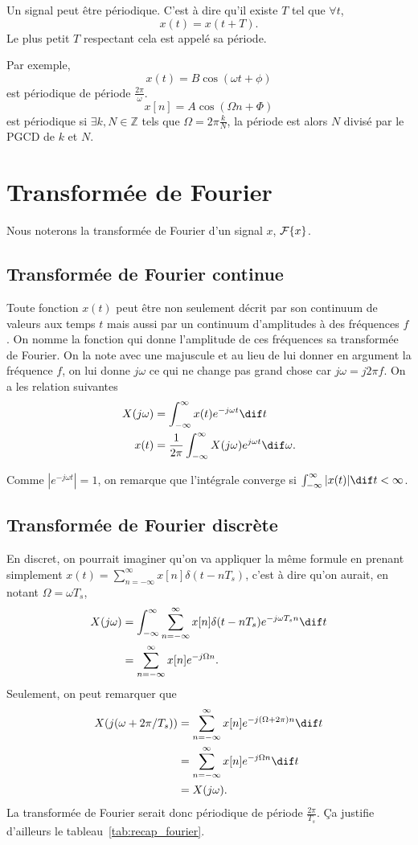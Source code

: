 Un signal peut être périodique.
C'est à dire qu'il existe $T$ tel que
$\forall t$,
\[ x(t) = x(t + T). \]
Le plus petit $T$ respectant cela est appelé sa période.

Par exemple,
\[ x(t) = B\cos(\omega t + \phi) \]
est périodique de période $\frac{2\pi}{\omega}$.
\[ x[n] = A\cos(\Omega n + \Phi) \]
est périodique si $\exists k, N \in \mathbb{Z}$ tels que
$\Omega = 2\pi\frac{k}{N}$, la période est alors $N$ divisé
par le PGCD de $k$ et $N$.

\section{Transformée de Fourier}
Nous noterons la transformée de Fourier d'un signal $x$, $\mathcal{F}\{x\}$.

\subsection{Transformée de Fourier continue}
Toute fonction $x(t)$ peut être non seulement décrit par son continuum de
valeurs aux temps $t$ mais aussi par un continuum d'amplitudes à des fréquences
$f$.
On nomme la fonction qui donne l'amplitude de ces fréquences sa transformée
de Fourier.
On la note avec une majuscule et au lieu de lui donner en argument la fréquence
$f$, on lui donne $j\omega$ ce qui ne change pas grand chose car
$j\omega = j2\pi f$.
On a les relation suivantes
\begin{align}
  \label{eq:tfc}
  X(j\omega) & = \int_{-\infty}^\infty x(t) e^{-j\omega t} \dif t\\
  \nonumber
  x(t) & = \frac{1}{2\pi} \int_{-\infty}^\infty X(j\omega) e^{j\omega t}
  \dif \omega.
\end{align}

Comme $|e^{-j\omega t}| = 1$, on remarque que l'intégrale
converge si $\int_{-\infty}^\infty |x(t)| \dif t < \infty$.

\subsection{Transformée de Fourier discrète}
\label{sec:fourier_discret}
En discret, on pourrait imaginer qu'on va appliquer la même formule en prenant
simplement $x(t) =  \sum_{n=-\infty}^\infty x[n] \delta(t-nT_s)$, c'est à dire
qu'on aurait, en notant $\Omega = \omega T_s$,
\begin{align}
  \label{eq:tfd}
  X(j\omega) & = \int_{-\infty}^\infty \sum_{n=-\infty}^\infty x[n]
  \delta(t-nT_s) e^{-j\omega T_sn} \dif t\\
  \nonumber
  & = \sum_{n=-\infty}^\infty x[n] e^{-j\Omega n}.
\end{align}
Seulement, on peut remarquer que
\begin{align*}
  X(j(\omega+2\pi/T_s)) & = \sum_{n=-\infty}^\infty x[n]
  e^{-j(\Omega+2\pi) n} \dif t\\
  & = \sum_{n=-\infty}^\infty x[n]
  e^{-j\Omega n} \dif t\\
  & = X(j\omega).
\end{align*}
La transformée de Fourier serait donc périodique de période $\frac{2\pi}{T_s}$.
Ça justifie d'ailleurs le tableau~\ref{tab:recap_fourier}.

